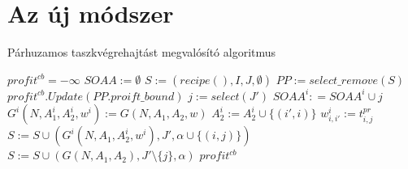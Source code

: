 \chapter{Az új módszer}

\begin{algorithm}
\caption{Párhuzamos taszkvégrehajtást megvalósító algoritmus}
\begin{algorithmic}[1]
	\State $profit^{cb} = -\infty$
	\State $SOAA:= \emptyset$
	\State $S:= {(recipe(),I,J,\emptyset)}$
		\State $PP:= select\_remove(S)$
					\State $profit^{cb}.Update(PP.proift\_bound)$
				\Else
					\State $j:=select(J')$
						\State $SOAA^i: = SOAA^i\cup j$
						\State $G^i(N,A_1^i,A_2^i,w^i):= G(N,A_1,A_2,w)$
							\State $A_2^i:= A_2^i \cup \{(i',i)\}$				
						\EndFor
							\State $w_{i,i'}^i:= t_{i,j}^{pr}$
						\EndFor
						\State $S:= S \cup (G^i(N,A_1,A_2^i,w^i),J',\alpha \cup \{(i,j)\})$
					\EndFor
						\State $S:= S \cup (G(N,A_1,A_2),J'\setminus\{j\},\alpha)$
					\EndIf
				\EndIf
			\EndIf
		\EndIf
	\EndWhile
	\State \Return $profit^{cb}$
\EndProcedure
\end{algorithmic}
\end{algorithm}